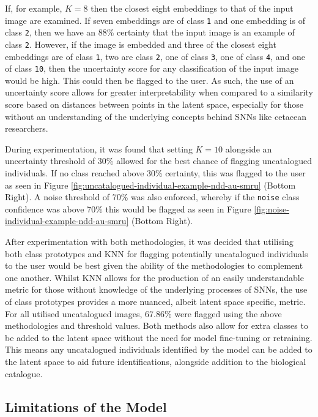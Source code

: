  If, for example, $K = 8$ then the closest eight embeddings to that of the input image are examined. If seven embeddings are of class \texttt{1} and one embedding is of class \texttt{2}, then we have an 88\% certainty that the input image is an example of class \texttt{2}. However, if the image is embedded and three of the closest eight embeddings are of class \texttt{1}, two are class \texttt{2}, one of class \texttt{3}, one of class \texttt{4}, and one of class \texttt{10}, then the uncertainty score for any classification of the input image would be high. This could then be flagged to the user. As such, the use of an uncertainty score allows for greater interpretability when compared to a similarity score based on distances between points in the latent space, especially for those without an understanding of the underlying concepts behind SNNs like cetacean researchers. 

During experimentation, it was found that setting $K = 10$ alongside an uncertainty threshold of 30\% allowed for the best chance of flagging uncatalogued individuals. If no class reached above 30\% certainty, this was flagged to the user as seen in Figure \ref{fig:uncatalogued-individual-example-ndd-au-smru} (Bottom Right). A noise threshold of 70\% was also enforced, whereby if the \texttt{noise} class confidence was above 70\% this would be flagged as seen in Figure \ref{fig:noise-individual-example-ndd-au-smru} (Bottom Right).

After experimentation with both methodologies, it was decided that utilising both class prototypes and KNN for flagging potentially uncatalogued individuals to the user would be best given the ability of the methodologies to complement one another. Whilst KNN allows for the production of an easily understandable metric for those without knowledge of the underlying processes of SNNs, the use of class prototypes provides a more nuanced, albeit latent space specific, metric. For all utilised uncatalogued images, 67.86\% were flagged using the above methodologies and threshold values. Both methods also allow for extra classes to be added to the latent space without the need for model fine-tuning or retraining. This means any uncatalogued individuals identified by the model can be added to the latent space to aid future identifications, alongside addition to the biological catalogue.

\subsection{Limitations of the Model}\label{ch:ID,sec:ModelSelection,sub:limitations}

